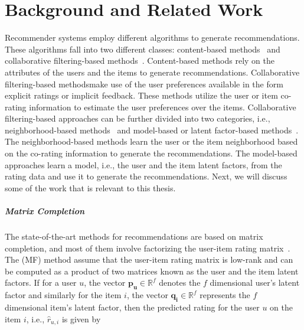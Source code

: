 \chapter{Background and Related Work}
\label{ch:related}

Recommender systems employ different algorithms to generate recommendations. These algorithms fall into
two different classes: content-based methods~\cite{lops2011content,pazzani2007content} and collaborative filtering-based methods~\cite{herlocker1999algorithmic}. Content-based methods rely on the attributes of the users and the items to generate recommendations. Collaborative filtering-based
methodsmake use of the user preferences available in the form explicit ratings or implicit feedback. These
methods utilize the user or item co-rating information to estimate the user preferences over the items.
Collaborative filtering-based approaches can be further divided into two categories, i.e., neighborhood-based
methods~\cite{shardanand1995social, konstan1997grouplens, SarwarKarypis01, deshpande2004item} and model-based or latent factor-based methods~\cite{koren2008factorization,Koren2009,koren2010collaborative}.  The neighborhood-based methods learn the user or the
item neighborhood based on the co-rating information to generate the recommendations.  The model-based approaches
learn a model, i.e., the user and the item latent factors,  from the rating data and use it to generate the
recommendations. Next, we will discuss some of the work that is relevant to this thesis.







\paragraph{Matrix Completion}
The state-of-the-art methods for recommendations are based on matrix
completion, and most of them involve factorizing the user-item rating
matrix~\cite{Koren2009, koren2008factorization, hu2008collaborative}.
The \MF (MF) method assume that the
user-item rating matrix is low-rank and can be computed as a product of two
matrices known as the user and the item latent factors. 
If for a user $u$, the vector $\bm{p_u} \in \mathbb{R}^f$ denotes the $f$ dimensional
user's latent factor and similarly for the item $i$, the vector 
$\bm{q_i} \in \mathbb{R}^f$ represents the $f$ dimensional item's latent factor, then the
predicted rating for the user $u$ on the item $i$, i.e., $\hat{r}_{u,i}$ is given by

